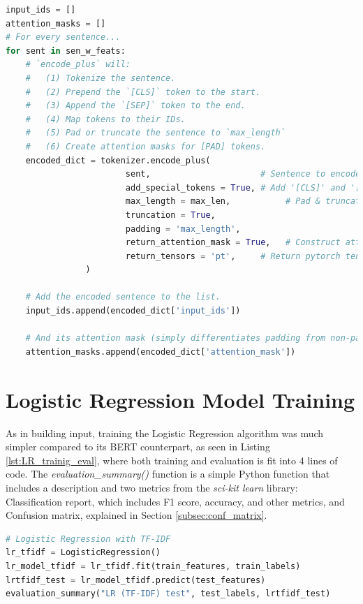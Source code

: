 \documentclass{l4proj}
\begin{document}
\begin{lstlisting}[language=python, float, caption={Encoding every sentence for BERT input.}, label=lst:BERT_encoder]
input_ids = []
attention_masks = []
# For every sentence...
for sent in sen_w_feats:
    # `encode_plus` will:
    #   (1) Tokenize the sentence.
    #   (2) Prepend the `[CLS]` token to the start.
    #   (3) Append the `[SEP]` token to the end.
    #   (4) Map tokens to their IDs.
    #   (5) Pad or truncate the sentence to `max_length`
    #   (6) Create attention masks for [PAD] tokens.
    encoded_dict = tokenizer.encode_plus(
                        sent,                      # Sentence to encode.
                        add_special_tokens = True, # Add '[CLS]' and '[SEP]'
                        max_length = max_len,           # Pad & truncate all sentences.
                        truncation = True,
                        padding = 'max_length',
                        return_attention_mask = True,   # Construct attn. masks.
                        return_tensors = 'pt',     # Return pytorch tensors.
                )
    
    # Add the encoded sentence to the list.    
    input_ids.append(encoded_dict['input_ids'])
    
    # And its attention mask (simply differentiates padding from non-padding).
    attention_masks.append(encoded_dict['attention_mask'])

\end{lstlisting}


\section{Logistic Regression Model Training}
\label{sec:imp_lr}

As in building input, training the Logistic Regression algorithm was much simpler compared to its BERT counterpart, as seen in Listing \ref{lst:LR_trainig_eval}, where both training and evaluation is fit into 4 lines of code. The \textit{evaluation\_summary()} function is a simple Python function that includes a description and two metrics from the \textit{sci-kit learn} library: Classification report, which includes F1 score, accuracy, and other metrics, and Confusion matrix, explained in Section \ref{subsec:conf_matrix}.

\begin{lstlisting}[language=python, float, caption={Training and evaluating the Logistic Regression algorithm.}, label=lst:LR_trainig_eval]
# Logistic Regression with TF-IDF
lr_tfidf = LogisticRegression()
lr_model_tfidf = lr_tfidf.fit(train_features, train_labels)
lrtfidf_test = lr_model_tfidf.predict(test_features)
evaluation_summary("LR (TF-IDF) test", test_labels, lrtfidf_test)
\end{lstlisting}
\end{document}
